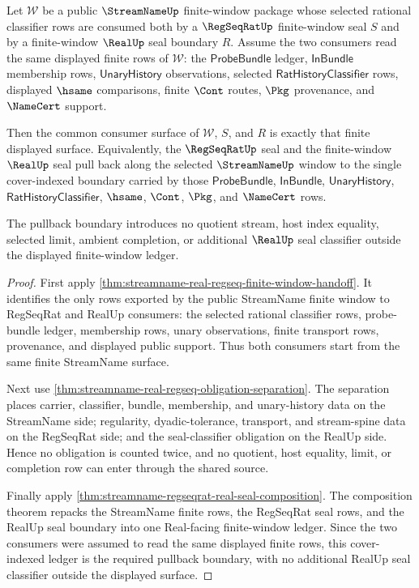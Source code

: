 \begin{theorem}
\label{thm:streamname-regseqrat-real-finite-window-seal-pullback}
Let $\mathcal{W}$ be a public $\StreamNameUp$ finite-window package whose
selected rational classifier rows are consumed both by a $\RegSeqRatUp$
finite-window seal $S$ and by a finite-window $\RealUp$ seal boundary $R$.
Assume the two consumers read the same displayed finite rows of
$\mathcal{W}$: the $\mathsf{ProbeBundle}$ ledger, $\mathsf{InBundle}$
membership rows, $\mathsf{UnaryHistory}$ observations, selected
$\mathsf{RatHistoryClassifier}$ rows, displayed $\hsame$ comparisons, finite
$\Cont$ routes, $\Pkg$ provenance, and $\NameCert$ support.

Then the common consumer surface of $\mathcal{W}$, $S$, and $R$ is exactly
that finite displayed surface. Equivalently, the $\RegSeqRatUp$ seal and the
finite-window $\RealUp$ seal pull back along the selected $\StreamNameUp$
window to the single cover-indexed boundary carried by those
$\mathsf{ProbeBundle}$, $\mathsf{InBundle}$, $\mathsf{UnaryHistory}$,
$\mathsf{RatHistoryClassifier}$, $\hsame$, $\Cont$, $\Pkg$, and $\NameCert$
rows.

The pullback boundary introduces no quotient stream, host index equality,
selected limit, ambient completion, or additional $\RealUp$ seal classifier
outside the displayed finite-window ledger.
\end{theorem}
\begin{proof}
First apply
\autoref{thm:streamname-real-regseq-finite-window-handoff}. It identifies the
only rows exported by the public StreamName finite window to RegSeqRat and
RealUp consumers: the selected rational classifier rows, probe-bundle ledger,
membership rows, unary observations, finite transport rows, provenance, and
displayed public support. Thus both consumers start from the same finite
StreamName surface.

Next use
\autoref{thm:streamname-real-regseq-obligation-separation}. The separation
places carrier, classifier, bundle, membership, and unary-history data on the
StreamName side; regularity, dyadic-tolerance, transport, and stream-spine
data on the RegSeqRat side; and the seal-classifier obligation on the RealUp
side. Hence no obligation is counted twice, and no quotient, host equality,
limit, or completion row can enter through the shared source.

Finally apply
\autoref{thm:streamname-regseqrat-real-seal-composition}. The composition
theorem repacks the StreamName finite rows, the RegSeqRat seal rows, and the
RealUp seal boundary into one Real-facing finite-window ledger. Since the two
consumers were assumed to read the same displayed finite rows, this
cover-indexed ledger is the required pullback boundary, with no additional
RealUp seal classifier outside the displayed surface.
\end{proof}

